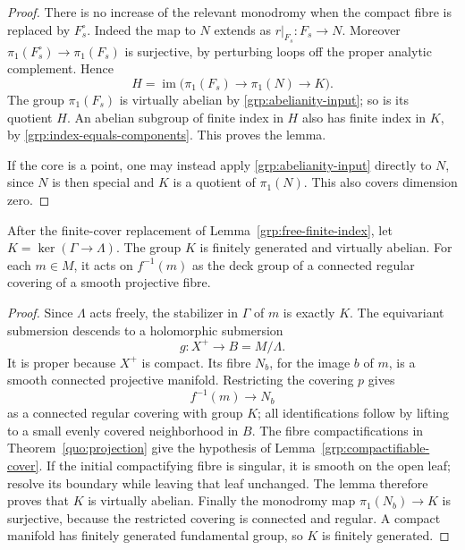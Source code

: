 \begin{proof}
There is no increase of the relevant monodromy when the compact fibre
is replaced by $F_s^\circ$.  Indeed the map to $N$ extends as
$r|_{F_s}:F_s\to N$.  Moreover
$\pi_1(F_s^\circ)\to\pi_1(F_s)$ is surjective, by perturbing loops
off the proper analytic complement.  Hence
\[
 H=\operatorname{im}\bigl(\pi_1(F_s)\longrightarrow\pi_1(N)
                  \longrightarrow K\bigr).
\]
The group $\pi_1(F_s)$ is virtually abelian by
\eqref{grp:abelianity-input}; so is its quotient $H$.
An abelian subgroup of finite index in $H$ also has finite index in
$K$, by \eqref{grp:index-equals-components}.  This proves the lemma.

If the core is a point, one may instead apply
\eqref{grp:abelianity-input} directly to $N$, since $N$ is then special
and $K$ is a quotient of $\pi_1(N)$.  This also covers dimension zero.
\end{proof}

\begin{theorem}\label{grp:kernel-abelian}
After the finite-cover replacement of
Lemma~\ref{grp:free-finite-index}, let
$K=\ker(\Gamma\to\Lambda)$.  The group $K$ is finitely generated and
virtually abelian.  For each $m\in M$, it acts on $f^{-1}(m)$ as the
deck group of a connected regular covering of a smooth projective
fibre.
\end{theorem}

\begin{proof}
Since $\Lambda$ acts freely, the stabilizer in $\Gamma$ of $m$ is
exactly $K$.  The equivariant submersion descends to a holomorphic
submersion
\[
 g:X^+\longrightarrow B=M/\Lambda.
\]
It is proper because $X^+$ is compact.  Its fibre $N_b$, for the image
$b$ of $m$, is a smooth connected projective manifold.  Restricting the
covering $p$ gives
\[
 f^{-1}(m)\longrightarrow N_b
\]
as a connected regular covering with group $K$; all identifications
follow by lifting to a small evenly covered neighborhood in $B$.
The fibre compactifications in Theorem~\ref{quo:projection} give
the hypothesis of Lemma~\ref{grp:compactifiable-cover}.  If the initial
compactifying fibre is singular, it is smooth on the open leaf;
resolve its boundary while leaving that leaf unchanged.  The lemma
therefore proves that $K$ is virtually abelian.
Finally the monodromy map $\pi_1(N_b)\to K$ is surjective, because the
restricted covering is connected and regular.  A compact manifold has
finitely generated fundamental group, so $K$ is finitely generated.
\end{proof}
